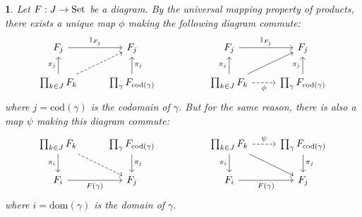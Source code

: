 \documentclass[12pt]{article}
\newtheorem{para}[theorem]{}
\begin{document}
\begin{para}
	Let $F:J\to\text{Set}$ be a diagram. By the universal mapping property of products, there exists a unique map $\phi$ making the following diagram commute:
	\begin{equation*}
\begin{tikzcd}
F_j \arrow[r, "1_{F_j}"]                                & F_j                                                     &  & F_j \arrow[r, "1_{F_j}"]                                                   & F_j                                                    \\
\prod_{k\in J}F_k \arrow[ru, dashed] \arrow[u, "\pi_j"] & \prod_\gamma F_{\text{cod}(\gamma)} \arrow[u, "\pi_j"'] &  & \prod_{k\in J}F_k \arrow[ru] \arrow[r, "\phi"', dashed] \arrow[u, "\pi_j"] & \prod_\gamma F_{\text{cod}(\gamma)} \arrow[u, "\pi_j"]
\end{tikzcd}	
	\end{equation*}
	where $j=\text{cod}(\gamma)$ is the codomain of $\gamma$. But for the same reason, there is also a map $\psi$ making this diagram commute:
	\begin{equation*}
\begin{tikzcd}
\prod_{k\in J}F_k \arrow[d, "\pi_i"'] \arrow[rd, dashed] & \prod_\gamma F_{\text{cod}(\gamma)} \arrow[d, "\pi_j"] &  & \prod_{k\in J}F_k \arrow[d, "\pi_i"'] \arrow[rd] \arrow[r, "\psi", dashed] & \prod_\gamma F_{\text{cod}(\gamma)} \arrow[d, "\pi_j"] \\
F_i \arrow[r, "F(\gamma)"']                              & F_j                                                    &  & F_i \arrow[r, "F(\gamma)"']                                                & F_j                                                   
\end{tikzcd}
	\end{equation*}
	where $i=\text{dom}(\gamma)$ is the domain of $\gamma$.


\end{para}
\end{document}
